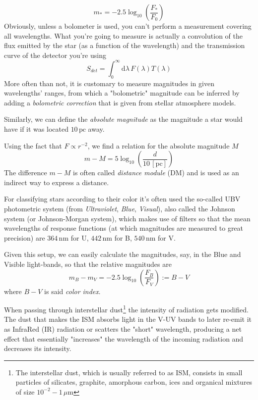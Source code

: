 \begin{equation}
    m_{*} = -2.5\log_{10}\left(\frac{F_{*}}{F_{0}}\right)
    \label{eq:apparentmagnitude}
\end{equation}
Obviously, unless a bolometer is used, you can't perform a measurement covering all wavelengths. What you're going to measure is actually a convolution of the flux emitted by the star (as a function of the wavelength) and the transmission curve of the detector you're using
\begin{equation*}
    S_{det} = \int_{0}^{\infty} \text{d}\lambda\, F(\lambda)T(\lambda)
\end{equation*}
More often than not, it is customary to measure magnitudes in given wavelengths' ranges, from which a "bolometric" magnitude can be inferred by adding a \emph{bolometric correction} that is given from stellar atmosphere models.
\par Similarly, we can define the \emph{absolute magnitude} as the magnitude a star would have if it was located $10\,\text{pc}$ away.
\par Using the fact that $F \propto r^{-2}$, we find a relation for the absolute magnitude $M$
\begin{equation}
    m-M = 5\log_{10}\left(\frac{d}{10\,[\text{pc}]}\right)
    \label{eq:absolutemagnitude}
\end{equation}
The difference $m-M$ is often called \emph{distance module} (DM) and is used as an indirect way to express a distance.
\par For classifying stars according to their color it's often used the so-called UBV photometric system (from \emph{Ultraviolet}, \emph{Blue}, \emph{Visual}), also called the Johnson system (or Johnson-Morgan system), which makes use of filters so that the mean wavelengths of response functions (at which magnitudes are measured to great precision) are $364\, \text{nm}$ for U, $442\, \text{nm}$ for B, $540\, \text{nm}$ for V.
\par Given this setup, we can easily calculate the magnitudes, say, in the Blue and Visible light-bands, so that the relative magnitudes are
\begin{equation*}
    m_{B}-m_{V} = -2.5\log_{10}\left(\frac{F_{B}}{F_{V}}\right) := B-V
\end{equation*}
where $B-V$ is said \emph{color index}.
\par When passing through interstellar dust\footnote{The interstellar dust, which is usually referred to as ISM, consists in small particles of silicates, graphite, amorphous carbon, ices and organical mixtures of size $10^{-2}-1\,\mu\text{m}$} the intensity of radiation gets modified. The dust that makes the ISM absorbs light in the V-UV bands to later re-emit it as InfraRed (IR) radiation or scatters the "short" wavelength, producing a net effect that essentially "increases" the wavelength of the incoming radiation and decreases its intensity.
